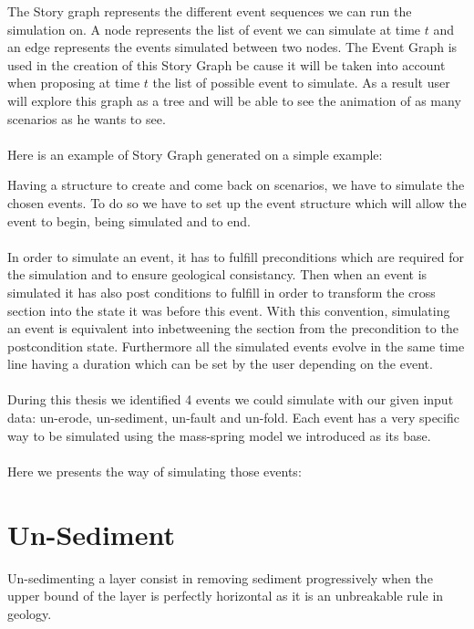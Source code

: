 \documentclass[12pt, a4paper]{report} %
\begin{document}
The Story graph represents the different event sequences we can run the simulation on. A node represents the list of event we can simulate at time $t$ and an edge represents the events simulated between two nodes. The Event Graph is used in the creation of this Story Graph be cause it will be taken into account when proposing at time $t$ the list of possible event to simulate. As a result user will explore this graph as a tree and will be able to see the animation of as many scenarios as he wants to see.\\\\

Here is an example of Story Graph generated on a simple example:


Having a structure to create and come back on scenarios, we have to simulate the chosen events. To do so we have to set up the event structure which will allow the event to begin, being simulated and to end.\\\\

In order to simulate an event, it has to fulfill preconditions which are required for the simulation and to ensure geological consistancy. Then when an event is simulated it has also post conditions to fulfill in order to transform the cross section into the state it was before this event. With this convention, simulating an event is equivalent into inbetweening the section from the precondition to the postcondition state. Furthermore all the simulated events evolve in the same time line having a duration which can be set by the user depending on the event.\\\\

During this thesis we identified 4 events we could simulate with our given input data: un-erode, un-sediment, un-fault and un-fold. Each event has a very specific way to be simulated using the mass-spring model we introduced as its base.\\\\

Here we presents the way of simulating those events:

\section{Un-Sediment}

Un-sedimenting a layer consist in removing sediment progressively when the upper bound of the layer is perfectly horizontal as it is an unbreakable rule in geology.\\\\
\end{document}
